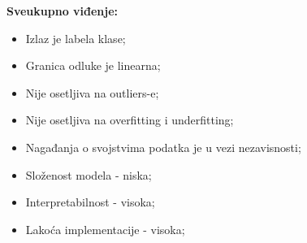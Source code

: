 \documentclass[fontsize=12bp, paper=a4]{scrarticle}
\begin{document}
\textbf{Sveukupno viđenje:}
\begin{itemize}
    \item Izlaz je labela klase;
    \item Granica odluke je linearna;
    \item Nije osetljiva na outliers-e;
    \item Nije osetljiva na overfitting i underfitting;
    \item Nagađanja o svojstvima podatka je u vezi nezavisnosti;
    \item Složenost modela - niska;
    \item Interpretabilnost - visoka;
    \item Lakoća implementacije - visoka;
\end{itemize}





\end{document}

